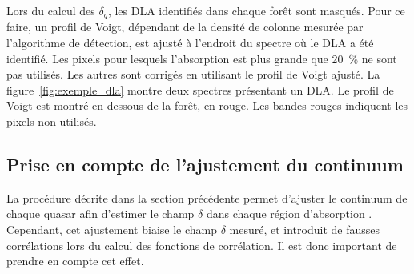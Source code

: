 Lors du calcul des $\delta_q$, les DLA identifiés dans chaque forêt sont masqués. Pour ce faire, un profil de Voigt, dépendant de la densité de colonne mesurée par l'algorithme de détection, est ajusté à l'endroit du spectre où le DLA a été identifié. Les pixels pour lesquels l'absorption est plus grande que \SI{20}{\percent} ne sont pas utilisés. Les autres sont corrigés en utilisant le profil de Voigt ajusté. La figure~\ref{fig:exemple_dla} montre deux spectres présentant un DLA. Le profil de Voigt est montré en dessous de la forêt, en rouge. Les bandes rouges indiquent les pixels non utilisés.


\subsection{Prise en compte de l'ajustement du continuum}
\label{subsec:projdelta}
La procédure décrite dans la section précédente permet d'ajuster le continuum de chaque quasar afin d'estimer le champ $\delta$ dans chaque région d'absorption \lya{}. Cependant, cet ajustement biaise le champ $\delta$ mesuré, et introduit de fausses corrélations lors du calcul des fonctions de corrélation. Il est donc important de prendre en compte cet effet.

